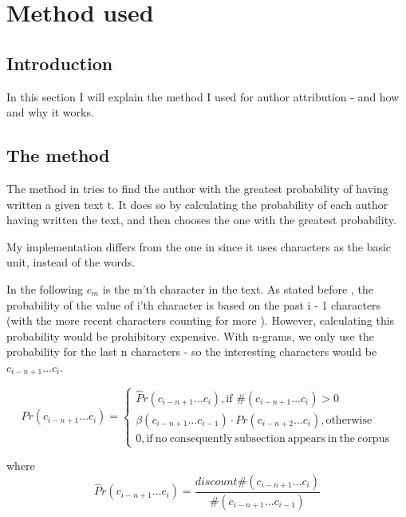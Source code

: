 \section{Method used}
\label{method}

\subsection{Introduction}
In this section I will explain the method I used for author attribution - and how and why it works.

\subsection{The method}
The method in \cite{nr4} tries to find the author with the greatest probability of having written a given text t. It does so by calculating the probability of each author having written the text, and then chooses the one with the greatest probability.

My implementation differs from the one in \cite{nr4} since it uses characters as the basic unit, instead of the words.

In the following $c_m$ is the m'th character in the text. As stated before , the probability of the value of i'th character is based on the past i - 1 characters (with the more recent characters counting for more ). However, calculating this probability would be prohibitory expensive. With n-grams, we only use the probability for the last n characters - so the interesting characters would be $c_{i - n + 1} \ldots c_{i}$.

\begin{equation}
\label{eq:probNorm}
Pr(c_{i - n + 1} \ldots c_{i}) = \left\{
\begin{array}{rl}
\hat{P}r(c_{i - n + 1} \ldots c_{i}), \text{if } \#(c_{i - n + 1} \ldots c_{i}) > 0\\
\beta(c_{i - n + 1} \ldots c_{i-1}) \cdot Pr(c_{i - n + 2} \ldots c_{i}), \mathrm{otherwise}\\
0, \mathrm{if\ no\ consequently\ subsection\ appears\ in\ the\ corpus}
\end{array} \right.
\end{equation}

where 
\begin{equation}
\label{eq:probHat}
\hat{P}r(c_{i - n + 1} \ldots c_{i}) = \frac{discount \#(c_{i - n + 1} \ldots c_{i})}{\#(c_{i - n + 1} \ldots c_{i-1})}
\end{equation}

